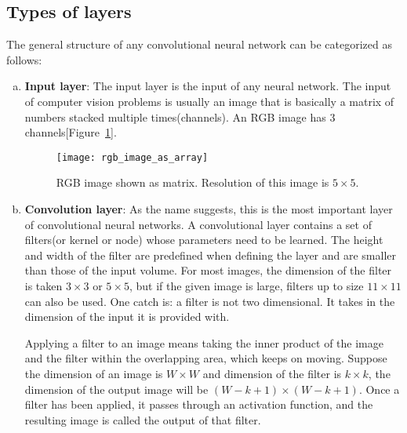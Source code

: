 \subsection{Types of layers}
\label{subsection:types_of_layers}
The general structure of any convolutional neural network can be categorized as follows:
\begin{enumerate}[(a)]
    \item \textbf{Input layer}:
        The input layer is the input of any neural network. The input of computer vision problems is usually an image that is basically a matrix of numbers stacked multiple times(channels). An RGB image has 3 channels[Figure~\ref{fig:RGB_image}].
        \begin{figure}[h!]
            \centering
            \texttt{[image: rgb\_image\_as\_array]}
            \caption[RGB image shown as matrix]{RGB image shown as matrix. Resolution of this image is $5\times5$.}
            \label{fig:RGB_image}
        \end{figure}
        
    \item \textbf{Convolution layer}:
        As the name suggests, this is the most important layer of convolutional neural networks. A convolutional layer contains a set of filters(or kernel or node) whose parameters need to be learned. The height and width of the filter are predefined when defining the layer and are smaller than those of the input volume. For most images, the dimension of the filter is taken $3\times3$ or $5\times5$, but if the given image is large, filters up to size $11\times11$ can also be used. One catch is: a filter is not two dimensional. It takes in the dimension of the input it is provided with.

        Applying a filter to an image means taking the inner product of the image and the filter within the overlapping area, which keeps on moving. Suppose the dimension of an image is $W\times W$ and dimension of the filter is $k\times k$, the dimension of the output image will be $(W-k+1)\times (W-k+1)$. Once a filter has been applied, it passes through an activation function, and the resulting image is called the output of that filter.
    

\end{enumerate}
